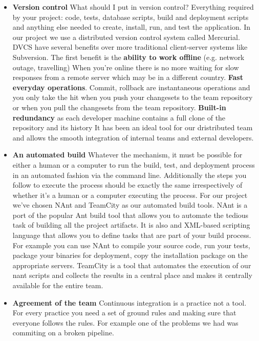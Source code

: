 \documentclass{article}
\begin{document}
\begin{itemize}
\item \textbf{Version control}
%
What should I put in version control?
%
Everything required by your project: code, tests, database scripts,
build and deployment scripts and anything else needed to create,
install, run, and test the application.
%
In our project we use a distributed version control system called
Mercurial.
%
DVCS have several benefits over more traditional client-server systems
like Subversion.
%
The first benefit is the \textbf{ability to work offline} (e.g. network outage,
travelling)
%
When you're online there is no more waiting for slow responses from a
remote server which may be in a different country.
%
\textbf{Fast everyday operations}. Commit, rollback are instantaneous
operations and you only take the hit when you push your changesets to
the team repository or when you pull the changesets from the team
repository.
%
\textbf{Built-in redundancy} as each developer machine contains a full
clone of the repository and its history
%
It has been an ideal tool for our dristributed team and allows the
smooth integration of internal teams and external developers.
%
\item \textbf{An automated build} 
%
Whatever the mechanism, it must be possible for either a human or a
computer to run the build, test, and deployment process in an
automated fashion via the command line.
%
Additionally the steps you follow to execute the process should be
exactly the same irrespectively of whether it's a human or a computer
executing the process.
%
For our project we've chosen NAnt and TeamCity as our automated build
tools.
%
NAnt is a port of the popular Ant build tool that allows you to
automate the tedious task of building all the project artifacts.
%
It is also and XML-based scripting language that allows you to define
tasks that are part of your build process.
%
For example you can use NAnt to compile your source code, run your
tests, package your binaries for deployment, copy the installation
package on the appropriate servers.
%
TeamCity is a tool that automates the execution of our nant scripts
and collects the results in a central place and makes it centrally
available for the entire team.
%
\item \textbf{Agreement of the team} 
%
Continuous integration is a practice not a tool.
%
For every practice you need a set of ground rules and making sure
that everyone follows the rules.
%
For example one of the problems we had was commiting on a broken
pipeline.
\end{itemize}
\end{document}
